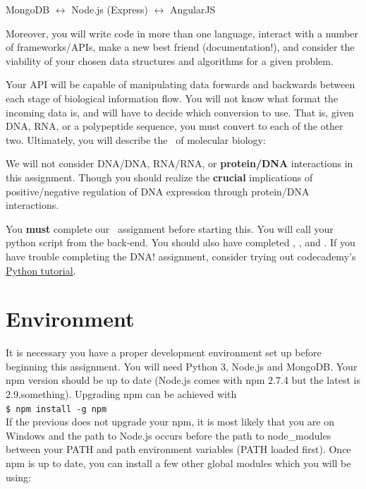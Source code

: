 \begin{center}
    MongoDB $\leftrightarrow$ Node.js (Express) $\leftrightarrow$ AngularJS
\end{center} 

Moreover, you will write code in more than one language,
interact with a number of frameworks/APIs, make a new best friend
(documentation!), and consider the viability of your chosen data structures and
algorithms for a given problem. 

Your API will be capable of manipulating data forwards and backwards
between each stage of biological information flow.  You will not know what
format the incoming data is, and will have to decide which conversion to use.
That is, given DNA, RNA, or a polypeptide sequence, you must convert to each
of the other two.  Ultimately, you will describe the \centraldogma\ of molecular
biology:



\mpnote

\noindent We will not consider DNA/DNA, RNA/RNA, or \textbf{protein/DNA}
interactions in this assignment. Though you should realize the \textbf{crucial} 
implications of positive/negative regulation of DNA expression through
protein/DNA interactions.\\


\noindent You \textbf{must} complete our \pythondna\ assignment before starting
this. You will call your python script from the back-end. You should also
have completed \javascripting,  \learnyounode, and \expressworks. If you have
trouble completing the DNA! assignment, consider trying out codecademy's 
\href{http://www.codecademy.com/en/tracks/python}{Python tutorial}.

\section{Environment}

It is necessary you have a proper development environment set up before 
beginning this assignment. You will need Python 3, Node.js and MongoDB. Your npm
version should be up to date (Node.js comes with npm 2.7.4 but the latest is
2.9.something). Upgrading npm can be achieved with \\

\noindent \texttt{\$ npm install -g npm} \\

If the previous does not upgrade your npm, it is most likely that you are
on Windows and the path to Node.js occurs before the path to node\_modules
between your PATH and path environment variables (PATH loaded first). 
Once npm is up to date, you can install a few other global modules
which you will be using:

